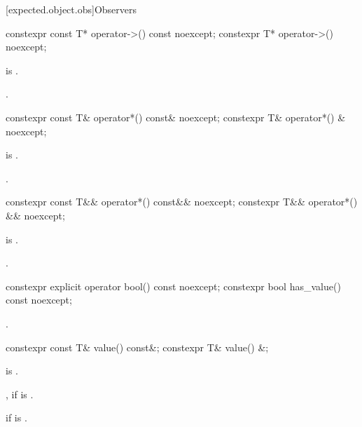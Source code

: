 [expected.object.obs]{Observers}

%
\begin{itemdecl}
constexpr const T* operator->() const noexcept;
constexpr T* operator->() noexcept;
\end{itemdecl}

\begin{itemdescr}
\pnum
\hardexpects
{} is .

\pnum
\returns
{}.
\end{itemdescr}

%
\begin{itemdecl}
constexpr const T& operator*() const& noexcept;
constexpr T& operator*() & noexcept;
\end{itemdecl}

\begin{itemdescr}
\pnum
\hardexpects
{} is .

\pnum
\returns
{}.
\end{itemdescr}

%
\begin{itemdecl}
constexpr const T&& operator*() const&& noexcept;
constexpr T&& operator*() && noexcept;
\end{itemdecl}

\begin{itemdescr}
\pnum
\hardexpects
{} is .

\pnum
\returns
{}.
\end{itemdescr}

%
%
\begin{itemdecl}
constexpr explicit operator bool() const noexcept;
constexpr bool has_value() const noexcept;
\end{itemdecl}

\begin{itemdescr}
\pnum
\returns
{}.
\end{itemdescr}

%
\begin{itemdecl}
constexpr const T& value() const&;
constexpr T& value() &;
\end{itemdecl}

\begin{itemdescr}
\pnum
\mandates
{} is .

\pnum
\returns
{}, if  is .

\pnum
\throws
{} if  is .
\end{itemdescr}

